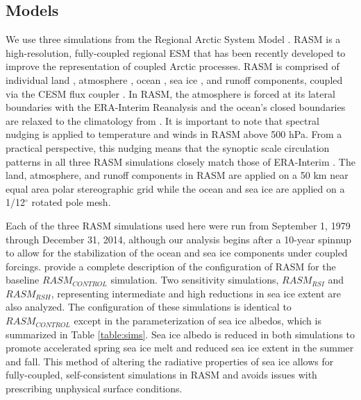 \subsection{Models}
\label{sec:models}
We use three simulations from the Regional Arctic System Model \citep[RASM; ][]{Hamman_2016a,Roberts_2015a}.
RASM is a high-resolution, fully-coupled regional ESM that has been recently developed to improve the representation of coupled Arctic processes.
RASM is comprised of individual land \citep[see ][]{Hamman_2016a}, atmosphere \citep[see ][]{Cassano_2016}, ocean \citep[see ][]{Roberts_2015a}, sea ice \citep[see ][]{Roberts_2015a}, and runoff \citep[see ][]{Hamman_2016b} components, coupled via the CESM flux coupler \citet{Craig_2011}.
In RASM, the atmosphere is forced at its lateral boundaries with the ERA-Interim Reanalysis \citep{Dee_2011} and the ocean's closed boundaries are relaxed to the climatology from \citet{Steele_2001}.
It is important to note that spectral nudging is applied to temperature and winds in RASM above 500 hPa.
From a practical perspective, this nudging means that the synoptic scale circulation patterns in all three RASM simulations closely match those of ERA-Interim \citep{Glisan_2013}.
The land, atmosphere, and runoff components in RASM are applied on a 50 km near equal area polar stereographic grid while the ocean and sea ice are applied on a 1/12$^{\circ}$ rotated pole mesh.

Each of the three RASM simulations used here were run from September 1, 1979 through December 31, 2014, although our analysis begins after a 10-year spinnup to allow for the stabilization of the ocean and sea ice components under coupled forcings.
\citet{Hamman_2016b} provide a complete description of the configuration of RASM for the baseline $RASM_{CONTROL}$ simulation.
Two sensitivity simulations, $RASM_{RSI}$ and $RASM_{RSH}$, representing intermediate and high reductions in sea ice extent are also analyzed.
The configuration of these simulations is identical to $RASM_{CONTROL}$ except in the parameterization of sea ice albedos, which is summarized in Table \ref{table:sims}.
Sea ice albedo is reduced in both simulations to promote accelerated spring sea ice melt and reduced sea ice extent in the summer and fall.
This method of altering the radiative properties of sea ice allows for fully-coupled, self-consistent simulations in RASM and avoids issues with prescribing unphysical surface conditions.

